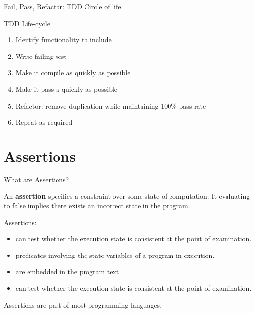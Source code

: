 \documentclass[11pt, xcolor=svgnames]{beamer}
\providecommand{\alert}[1]{\textbf{#1}}
\begin{document}


\begin{frame}{Fail, Pass, Refactor:  TDD Circle of life}

\begin{block}{TDD Life-cycle}
	\begin{enumerate}
		\item Identify functionality to include
		\item Write failing test
		\item Make it compile as quickly as possible
		\item Make it pass a quickly as possible
		\item Refactor: remove duplication while maintaining 100\% pass rate
		\item Repeat as required
	\end{enumerate}
\end{block}

\end{frame}


\section{Assertions}


\begin{frame}{What are Assertions?}

An \alert{assertion} specifies a constraint over some state of computation. It evaluating to false implies there exists an incorrect state in the program.

Assertions: 

\begin{itemize}
  \item can test whether the execution state is consistent at the point of examination.
  \item predicates involving the state variables of a program in execution.
  \item are embedded in the program text
  \item can test whether the execution state is consistent at the point of examination.
\end{itemize}

Assertions are part of most programming languages.

\end{frame}
\end{document}
